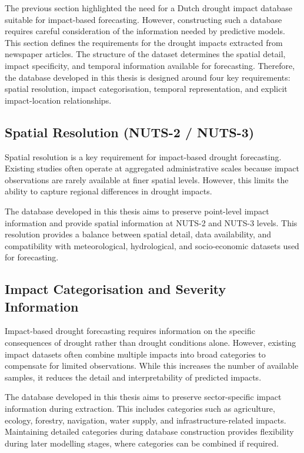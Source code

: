 The previous section highlighted the need for a Dutch drought impact database suitable for impact-based forecasting. However, constructing such a database requires careful consideration of the information needed by predictive models. This section defines the requirements for the drought impacts extracted from newspaper articles. The structure of the dataset determines the spatial detail, impact specificity, and temporal information available for forecasting. Therefore, the database developed in this thesis is designed around four key requirements: spatial resolution, impact categorisation, temporal representation, and explicit impact-location relationships.

\subsection{Spatial Resolution (NUTS-2 / NUTS-3)}

Spatial resolution is a key requirement for impact-based drought forecasting. Existing studies often operate at aggregated administrative scales because impact observations are rarely available at finer spatial levels. However, this limits the ability to capture regional differences in drought impacts.

The database developed in this thesis aims to preserve point-level impact information and provide spatial information at NUTS-2 and NUTS-3 levels. This resolution provides a balance between spatial detail, data availability, and compatibility with meteorological, hydrological, and socio-economic datasets used for forecasting.

\subsection{Impact Categorisation and Severity Information}

Impact-based drought forecasting requires information on the specific consequences of drought rather than drought conditions alone. However, existing impact datasets often combine multiple impacts into broad categories to compensate for limited observations. While this increases the number of available samples, it reduces the detail and interpretability of predicted impacts.

The database developed in this thesis aims to preserve sector-specific impact information during extraction. This includes categories such as agriculture, ecology, forestry, navigation, water supply, and infrastructure-related impacts. Maintaining detailed categories during database construction provides flexibility during later modelling stages, where categories can be combined if required.

